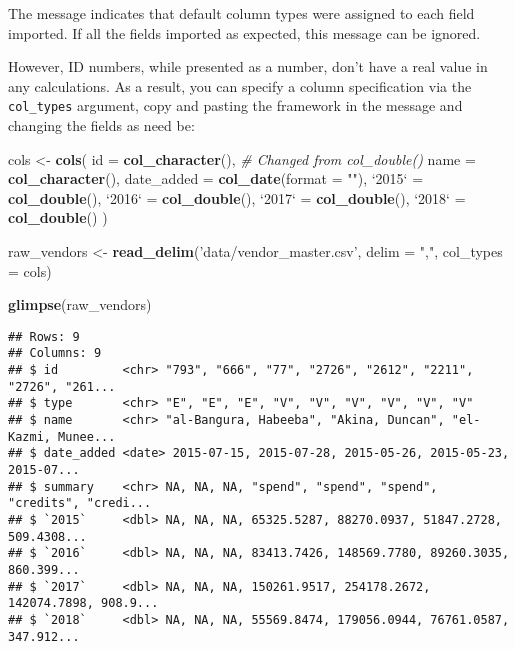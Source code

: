 \documentclass[
]{book}
\newenvironment{Shaded}{\begin{snugshade}}{\end{snugshade}}
\newcommand{\CommentTok}[1]{\textcolor[rgb]{0.56,0.35,0.01}{\textit{#1}}}
\newcommand{\DataTypeTok}[1]{\textcolor[rgb]{0.13,0.29,0.53}{#1}}
\newcommand{\KeywordTok}[1]{\textcolor[rgb]{0.13,0.29,0.53}{\textbf{#1}}}
\newcommand{\NormalTok}[1]{#1}
\newcommand{\StringTok}[1]{\textcolor[rgb]{0.31,0.60,0.02}{#1}}
\begin{document}
The message indicates that default column types were assigned to each field imported. If all the fields imported as expected, this message can be ignored.

However, ID numbers, while presented as a number, don't have a real value in any calculations. As a result, you can specify a column specification via the \texttt{col\_types} argument, copy and pasting the framework in the message and changing the fields as need be:

\begin{Shaded}
\begin{Highlighting}[]
\NormalTok{cols <-}\StringTok{ }\KeywordTok{cols}\NormalTok{(}
  \DataTypeTok{id =} \KeywordTok{col_character}\NormalTok{(), }\CommentTok{# Changed from col_double()}
  \DataTypeTok{name =} \KeywordTok{col_character}\NormalTok{(),}
  \DataTypeTok{date_added =} \KeywordTok{col_date}\NormalTok{(}\DataTypeTok{format =} \StringTok{""}\NormalTok{),}
  \StringTok{`}\DataTypeTok{2015}\StringTok{`}\NormalTok{ =}\StringTok{ }\KeywordTok{col_double}\NormalTok{(),}
  \StringTok{`}\DataTypeTok{2016}\StringTok{`}\NormalTok{ =}\StringTok{ }\KeywordTok{col_double}\NormalTok{(),}
  \StringTok{`}\DataTypeTok{2017}\StringTok{`}\NormalTok{ =}\StringTok{ }\KeywordTok{col_double}\NormalTok{(),}
  \StringTok{`}\DataTypeTok{2018}\StringTok{`}\NormalTok{ =}\StringTok{ }\KeywordTok{col_double}\NormalTok{()}
\NormalTok{)}

\NormalTok{raw_vendors <-}\StringTok{ }\KeywordTok{read_delim}\NormalTok{(}\StringTok{'data/vendor_master.csv'}\NormalTok{, }\DataTypeTok{delim =} \StringTok{","}\NormalTok{, }\DataTypeTok{col_types =}\NormalTok{ cols)}

\KeywordTok{glimpse}\NormalTok{(raw_vendors)}
\end{Highlighting}
\end{Shaded}

\begin{verbatim}
## Rows: 9
## Columns: 9
## $ id         <chr> "793", "666", "77", "2726", "2612", "2211", "2726", "261...
## $ type       <chr> "E", "E", "E", "V", "V", "V", "V", "V", "V"
## $ name       <chr> "al-Bangura, Habeeba", "Akina, Duncan", "el-Kazmi, Munee...
## $ date_added <date> 2015-07-15, 2015-07-28, 2015-05-26, 2015-05-23, 2015-07...
## $ summary    <chr> NA, NA, NA, "spend", "spend", "spend", "credits", "credi...
## $ `2015`     <dbl> NA, NA, NA, 65325.5287, 88270.0937, 51847.2728, 509.4308...
## $ `2016`     <dbl> NA, NA, NA, 83413.7426, 148569.7780, 89260.3035, 860.399...
## $ `2017`     <dbl> NA, NA, NA, 150261.9517, 254178.2672, 142074.7898, 908.9...
## $ `2018`     <dbl> NA, NA, NA, 55569.8474, 179056.0944, 76761.0587, 347.912...
\end{verbatim}
\end{document}
